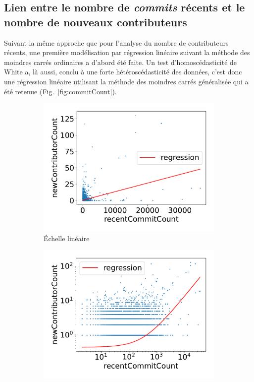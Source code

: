 \documentclass[dvipsnames]{llncs}
\newcommand{\en}[1]{\foreignlanguage{english}{\emph{#1}}}
\begin{document}
    \subsection{Lien entre le nombre de \en{commits} récents et le nombre de nouveaux contributeurs}

    Suivant la même approche que pour l'analyse du nombre de contributeurs récents, une première modélisation
    par régression linéaire suivant la méthode des moindres carrés ordinaires a d'abord été faite. Un test
    d'homoscédasticité de White a, là aussi, conclu à une forte hétéroscédasticité des données, c'est donc une
    régression linéaire utilisant la méthode des moindres carrés généralisée qui a été retenue
    (Fig.~\ref{fig:commitCount}).

    \begin{figure}[ht]
        \centering
        \begin{subfigure}[t]{0.5\textwidth}
            \includegraphics[width=\textwidth]{../experiment/data_analysis/recentCommitCountRegression_linearScale}
            \caption{Échelle linéaire}
        \end{subfigure}%
        \begin{subfigure}[t]{0.5\textwidth}
            \includegraphics[width=\textwidth]{../experiment/data_analysis/recentCommitCountRegression_logScale}

\end{subfigure}
\end{figure}
\end{document}
